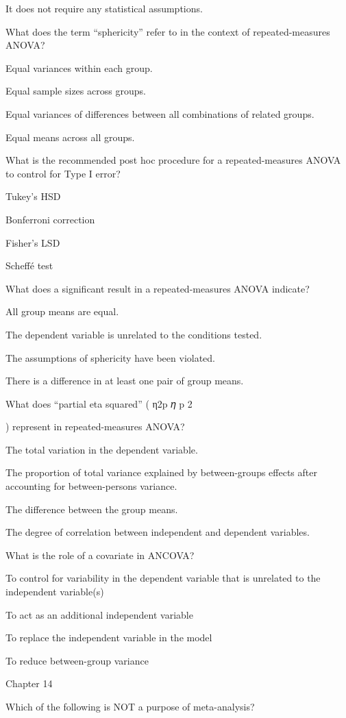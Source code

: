 \documentclass[
  letterpaper,
  DIV=11,
  numbers=noendperiod]{scrreprt}
\begin{document}
It does not require any statistical assumptions.

What does the term ``sphericity'' refer to in the context of
repeated-measures ANOVA?

Equal variances within each group.

Equal sample sizes across groups.

Equal variances of differences between all combinations of related
groups.

Equal means across all groups.

What is the recommended post hoc procedure for a repeated-measures ANOVA
to control for Type I error?

Tukey's HSD

Bonferroni correction

Fisher's LSD

Scheffé test

What does a significant result in a repeated-measures ANOVA indicate?

All group means are equal.

The dependent variable is unrelated to the conditions tested.

The assumptions of sphericity have been violated.

There is a difference in at least one pair of group means.

What does ``partial eta squared'' ( η2p 𝜂 p 2

) represent in repeated-measures ANOVA?

The total variation in the dependent variable.

The proportion of total variance explained by between-groups effects
after accounting for between-persons variance.

The difference between the group means.

The degree of correlation between independent and dependent variables.

What is the role of a covariate in ANCOVA?

To control for variability in the dependent variable that is unrelated
to the independent variable(s)

To act as an additional independent variable

To replace the independent variable in the model

To reduce between-group variance

Chapter 14

Which of the following is NOT a purpose of meta-analysis?
\end{document}
